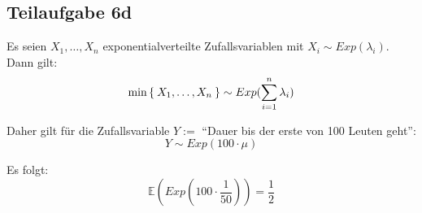 \documentclass[a4paper]{scrartcl}
\begin{document}
\subsection*{Teilaufgabe 6d}
Es seien $X_1, \dots, X_n$ exponentialverteilte Zufallsvariablen mit $X_i \sim Exp(\lambda_i)$.
Dann gilt:
\[\min\Set{X_1, \dots, X_n} \sim Exp(\sum_{i=1}^n \lambda_i)\]

Daher gilt für die Zufallsvariable $Y := $ \enquote{Dauer bis der erste von 100 Leuten geht}:
\[Y \sim Exp(100 \cdot \mu)\]

Es folgt:
\[\mathbb{E}(Exp(100 \cdot \frac{1}{50})) = \frac{1}{2}\]
\end{document}
